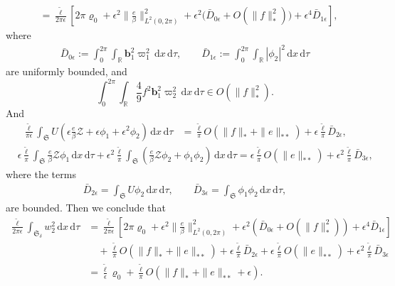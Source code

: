 \documentclass[10pt, reqno]{amsart}
\numberwithin{equation}{section}
\theoremstyle{definition}
\begin{document}
{\begin{align*}
\nonumber\\[2mm]
& =
 \frac {\tilde \ell} {2\pi \epsilon} \left[ 2\pi \varrho_0 + \epsilon^2 \Big\|\frac e\beta \Big\|^2_{L^2(0, 2\pi)} + \epsilon^2\big( \bar{D}_{0\epsilon} + O\left(\|f\|_*^2 \right) \big) + \epsilon^4 \bar{D}_{1\epsilon} \right],
\end{align*}
 where
\begin{align*}
 \bar{D}_{0\epsilon} := \int_0^{2\pi} \int_{\mathbb R} {\mathbf b}_1^2\varpi_1^2 \, {\mathrm d} x \,{\mathrm d}\tau,
\qquad
\bar{D}_{1\epsilon} := \int_0^{2\pi} \int_{\mathbb R} |\phi_2|^2 \, {\mathrm d} x \,{\mathrm d}\tau
\end{align*}
 are uniformly bounded, and
\[ \int_0^{2\pi} \int_{\mathbb R} \frac49f^2 {\mathbf b}_1^2\varpi_2^2 \, {\mathrm d} x \,{\mathrm d}\tau \in O\left(\|f\|_*^2 \right). \]
 And
\begin{align*}
\frac {\tilde \ell} {\pi \epsilon} \int_{{\mathfrak S}} U \left(\epsilon \frac e\beta \mathcal Z + \epsilon \phi_1 + \epsilon^2\phi_2 \right)\, {\mathrm d} x \,{\mathrm d}\tau
& = \frac {\tilde \ell} {\pi} O\left(\|f\|_* + \|e\|_{**} \right) +\epsilon \frac {\tilde \ell} {\pi} \bar{D}_{2\epsilon},
\end{align*}
\begin{align*}
& \epsilon\frac {\tilde \ell} {\pi} \int_{{\mathfrak S}} \frac e\beta \mathcal Z \phi_1\, {\mathrm d} x \,{\mathrm d}\tau
 + \epsilon^2\frac {\tilde \ell} {\pi} \int_{{\mathfrak S}}\left( \frac e\beta \mathcal Z \phi_2 + \phi_1 \phi_2 \right) \, {\mathrm d} x \,{\mathrm d}\tau
= \epsilon \frac {\tilde \ell} {\pi} O\left(\|e\|_{**} \right)
+\epsilon^2\frac {\tilde \ell} {\pi} \bar{D}_{3\epsilon},
\end{align*}
 where the terms
\begin{align*}
 \bar{D}_{2\epsilon} = \int_{{\mathfrak S}} U \phi_2 \, {\mathrm d} x \,{\mathrm d}\tau,
\qquad
\bar{D}_{3\epsilon} = \int_{{\mathfrak S}} \phi_1 \phi_2 \, {\mathrm d} x \,{\mathrm d}\tau,
\end{align*}
 are bounded.
 Then we conclude that
\begin{align} \label{w2integral}
\frac {\tilde \ell} {2\pi \epsilon} \int_{{\mathfrak S}_\delta} w_2^2 \, {\mathrm d} x \,{\mathrm d}\tau
& =
 \frac {\tilde \ell} {2\pi \epsilon} \left[ 2\pi \varrho_0 + \epsilon^2\|\frac e\beta\|^2_{L^2(0, 2\pi)} + \epsilon^2\left( \bar{D}_{0\epsilon} + O\left(\|f\|_*^2 \right) \right) + \epsilon^4 \bar{D}_{1\epsilon} \right]
\nonumber\\[2mm]
& \quad +
 \frac {\tilde \ell} {\pi} O\left(\|f\|_* + \|e\|_{**} \right) +\epsilon \frac {\tilde \ell} {\pi} \bar{D}_{2\epsilon} +\epsilon \frac {\tilde \ell} {\pi} O\left(\|e\|_{**} \right) +\epsilon^2\frac {\tilde \ell} {\pi} \bar{D}_{3\epsilon}
\nonumber\\[2mm]
& = \frac {\tilde \ell} {\epsilon} \varrho_0 +
 \frac {\tilde \ell} {\pi} O\left(\|f\|_* + \|e\|_{**} +\epsilon \right).
\end{align}

}
\end{document}
